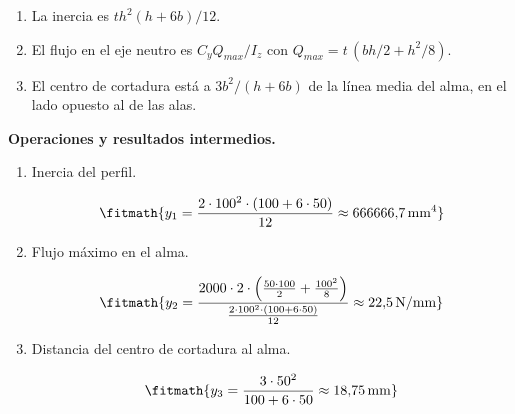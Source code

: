 \begin{enumerate}

\item La inercia es $t h^2 (h + 6b)/12$.

\item El flujo en el eje neutro es $C_y Q_{max}/I_z$ con $Q_{max} = t\,(b h/2 + h^2/8)$.

\item El centro de cortadura está a $3b^2/(h + 6b)$ de la línea media del alma, en el lado opuesto al de las alas.

\end{enumerate}

\noindent\textbf{Operaciones y resultados intermedios.}

\begin{enumerate}

\item Inercia del perfil.

\[\fitmath{y_{1}=\frac{2\cdot {100}^{2}\cdot \left(100+6\cdot 50\right)}{12}\approx 666666{,}7\,\mathrm{mm^{4}}}\]

\item Flujo máximo en el alma.

\[\fitmath{y_{2}=\frac{2000\cdot 2\cdot \left(\frac{50\cdot 100}{2}+\frac{{100}^{2}}{8}\right)}{\frac{2\cdot {100}^{2}\cdot \left(100+6\cdot 50\right)}{12}}\approx 22{,}5\,\mathrm{N/mm}}\]

\item Distancia del centro de cortadura al alma.

\[\fitmath{y_{3}=\frac{3\cdot {50}^{2}}{100+6\cdot 50}\approx 18{,}75\,\mathrm{mm}}\]

\end{enumerate}
